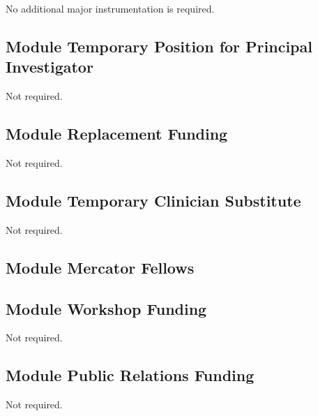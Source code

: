 No additional major instrumentation is required. 





\subsection{Module Temporary Position for Principal Investigator}

Not required. 

\subsection{Module Replacement Funding}

Not required. 

\subsection{Module Temporary Clinician Substitute}

Not required. 


\subsection{Module Mercator Fellows}

\subsection{Module Workshop Funding}

Not required. 


\subsection{Module Public Relations Funding}

Not required. 


